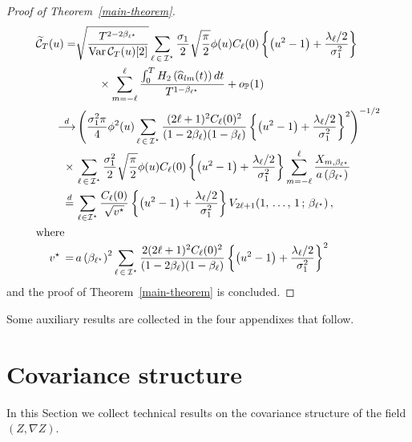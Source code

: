 \documentclass[10pt]{amsart}
\theoremstyle{definition}\newtheorem{defi}[theo]{Definition}\newtheorem{rema}[theo]{Remark}\newtheorem{exam}[theo]{Example}\newtheorem{exem}[theo]{Example}\newtheorem{nota}[theo]{Notation}
\newcommand{\clI}{\mathcal{I}}
\newcommand{\clC}{\mathcal{C}}
\newcommand{\bbP}{\mathbb{P}}
\DeclareMathOperator{\Var}{Var}
\begin{document}
\begin{proof}[Proof of Theorem~\ref{main-theorem}]
\begin{align*}
\widetilde{\clC}_{T}(u)=&\sqrt{\frac{T^{2-2\beta_{\ell^\star}}}{\Var \clC_{T}(u)[2]}} \sum_{\ell\,\in\,\clI^\star} \frac{\sigma_1}{2}\sqrt{\frac\pi2} \phi(u) C_\ell(0) \left\{\left(u^{2}-1\right)+\frac{\lambda _{\ell}/2}{\sigma_{1}^{2}}\right\}\\
&\qquad\times \sum_{m=-\ell}^{\ell} \frac{\int_{0}^T H_2\left(\widehat a_{lm}(t)\right)dt}{T^{1-\beta_{\ell^\star}}}+o_{\bbP}(1)
\\
\mathop{\longrightarrow}^d &\left(\frac{\sigma_{1}^{2}\pi }{4}\phi ^{2}(u)\sum_{\ell\, \in\,\clI^\star} \frac{(2\ell+1)^{2} C_\ell(0)^2}{(1-2\beta_\ell)(1-\beta_\ell)} \left\{ \left(u^{2}-1\right)+\frac{\lambda _{\ell}/2}{\sigma_{1}^{2}}\right\}^2 \right)^{-1/2}
\\
\qquad\times\,&\sum_{\ell\,\in\,\clI^\star} \frac{\sigma_1^2}{2}\sqrt{\frac\pi2} \phi(u) C_\ell(0) \left\{\left(u^{2}-1\right)+\frac{\lambda _{\ell}/2}{\sigma_{1}^{2}}\right\}\sum_{m=-\ell}^{\ell} \frac{X_{m,\beta_{\ell^\star}}}{a\left(\beta_{\ell^\star}\right)}
\\
\mathop{=}^{d}\,&\sum_{\ell \in \clI^\star} \frac{C_\ell(0)}{\sqrt{v^\star}}\left\{\left(u^{2}-1\right)+\frac{\lambda _{\ell}/2}{\sigma_{1}^{2}}\right\}V_{2\ell+1}(1,\,\dots,\,1\,;\,\beta_{\ell^\star})\,,
\\
\intertext{where}
v^\star\,=\,& a\left(\beta_{\ell^\star}\right)^2 \sum_{\ell\, \in\,\clI^\star} \frac{2(2\ell+1)^{2} C_\ell(0)^2}{(1-2\beta_\ell)(1-\beta_\ell)} \left\{ \left(u^{2}-1\right)+\frac{\lambda _{\ell}/2}{\sigma_{1}^{2}}\right\}^2
\end{align*}
and the proof of Theorem~\ref{main-theorem} is concluded.
\end{proof}

Some auxiliary results are collected in the four appendixes that follow.


\appendix

\section{Covariance structure}
\label{app-cov}

In this Section we collect technical results on the covariance structure of the field $(Z, \nabla Z)$.
\end{document}
